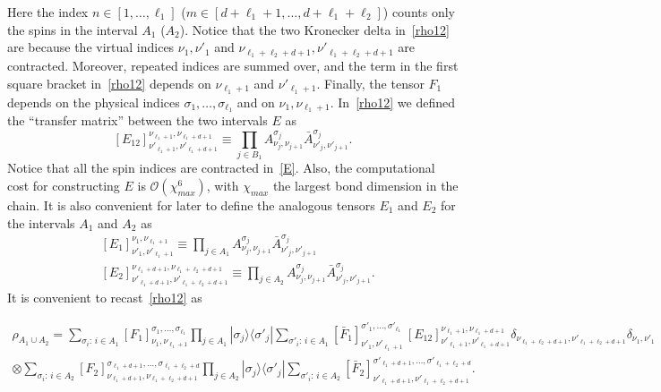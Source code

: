 \documentclass[twocolumn,superscriptaddress,prb,10pt]{revtex4-1}
\begin{document}
Here the index $n\in[1,\dots,\ell_1]$ ($m\in[d+\ell_1+1,\dots,d+\ell_1+\ell_2]$) counts 
only the spins in the interval $A_1$ ($A_2$). Notice that the two Kronecker delta 
in~\eqref{rho12} are because the virtual indices $\nu_1,\nu'_1$ and 
$\nu_{\ell_1+\ell_2+d+1},\nu'_{\ell_1+\ell_2+d+1}$ are contracted. Moreover, repeated 
indices are summed over, and the term in the first square bracket in~\eqref{rho12} 
depends on $\nu_{\ell_1+1}$ and $\nu'_{\ell_1+1}$. Finally, the tensor $F_1$ depends on 
the physical indices $\sigma_1,\dots,\sigma_{\ell_1}$ and on $\nu_1,\nu_{\ell_1+1}$.
In~\eqref{rho12} we defined the ``transfer matrix'' between the two intervals $E$ as 
%
\begin{equation}
\label{E}
[E_{12}]^{\nu_{\ell_1+1},\nu_{\ell_1+d+1}}_{\nu'_{\ell_1+1},\nu'_{\ell_1+d+1}}\equiv 
\prod\limits_{j\in B_1}A^{\sigma_j}_{\nu_j,\nu_{j+1}}
\bar A^{\sigma_j}_{\nu'_j,\nu'_{j+1}}. 
\end{equation}
%
Notice that all the spin indices are contracted in~\eqref{E}. Also, the computational 
cost for constructing $E$ is ${\mathcal O}(\chi^6_{max})$, with $\chi_{max}$ the 
largest bond dimension in the chain. 
It is also convenient for later to define the analogous tensors $E_1$ and $E_2$ for 
the intervals $A_1$ and $A_2$ as 
%
\begin{align}
& [E_1]^{\nu_1,\nu_{\ell_1+1}}_{\nu'_1,\nu'_{\ell_1+1}}\equiv
\prod\limits_{j\in A_1}A^{\sigma_j}_{\nu_j,\nu_{j+1}}
\bar A^{\sigma_j}_{\nu'_j,\nu'_{j+1}}\\
& [E_2]^{\nu_{\ell_1+d+1},\nu_{\ell_1+\ell_2+d+1}}_{\nu'_{\ell_1+d+1},
\nu'_{\ell_1+\ell_2+d+1}}\equiv
\prod\limits_{j\in A_2}A^{\sigma_j}_{\nu_j,\nu_{j+1}}
\bar A^{\sigma_j}_{\nu'_j,\nu'_{j+1}}.
\end{align}
%
It is convenient to recast~\eqref{rho12} as 
%
\begin{widetext}
\begin{multline}
\rho_{A_1\cup A_2}=\sum_{\sigma_i:\, i\in A_1}
[F_1]^{\sigma_1,\dots,\sigma_{\ell_1}}_{\nu_1,\nu_{\ell_1+1}}\prod_{j\in A_1}|\sigma_j\rangle
\langle\sigma'_j|\sum_{\sigma'_i:\, i\in A_1}
[\bar F_1]^{\sigma'_1,\dots,\sigma'_{\ell_1}}_{\nu'_1,\nu'_{\ell_1+1}}\,
[E_{12}]^{\nu_{\ell_1+1},\nu_{\ell_1+d+1}}_{\nu'_{\ell_1+1},\nu'_{\ell_1+d+1}}
\delta_{\nu_{\ell_1+\ell_2+d+1},
\nu'_{\ell_1+\ell_2+d+1}}\delta_{\nu_1,\nu'_1}
\\\otimes\sum_{\sigma_i:\, i\in A_2}
[F_2]^{\sigma_{\ell_1+d+1},\dots,\sigma_{\ell_1+\ell_2+d}}_{\nu_{\ell_1+d+1},
\nu_{\ell_1+\ell_2+d+1}}\prod_{j\in A_2}|\sigma_j\rangle\langle\sigma'_j|
\sum_{\sigma'_i:\, i\in A_2}
[\bar F_2]^{\sigma'_{\ell_1+d+1},\dots,\sigma'_{\ell_1+\ell_2+d}}_{\nu'_{\ell_1+d+1},
\nu'_{\ell_1+\ell_2+d+1}}. 
\end{multline}
\end{widetext}
\end{document}

